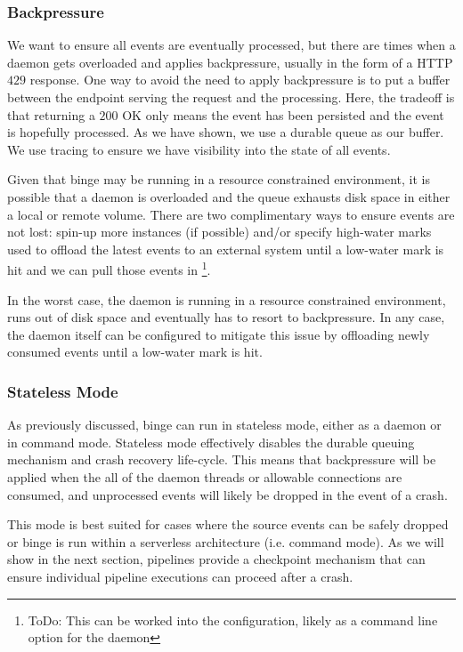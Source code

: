 \documentclass[10pt,twocolumn]{article}
\begin{document}
\subsubsection{Backpressure}

We want to ensure all events are eventually processed, but there are times when
a daemon gets overloaded and applies backpressure, usually in the form of a
HTTP $429$ response.  One way to avoid the need to apply backpressure is to put
a buffer between the endpoint serving the request and the processing.  Here, the
tradeoff is that returning a $200$ OK only means the event has been persisted
and the event is hopefully processed.  As we have shown, we use a durable queue
as our buffer.  We use tracing to ensure we have visibility into the state of
all events.  

Given that binge may be running in a resource constrained environment, it is
possible that a daemon is overloaded and the queue exhausts disk space in
either a local or remote volume.  There are two complimentary ways to ensure
events are not lost: spin-up more instances (if possible) and/or specify
high-water marks used to offload the latest events to an external system until
a low-water mark is hit and we can pull those events in \footnote{ToDo: This
can be worked into the configuration, likely as a command line option for the
daemon}.

In the worst case, the daemon is running in a resource constrained environment,
runs out of disk space and eventually has to resort to backpressure.  In any
case, the daemon itself can be configured to mitigate this issue by offloading
newly consumed events until a low-water mark is hit.

\subsubsection{Stateless Mode}

As previously discussed, binge can run in stateless mode, either as a daemon or
in command mode.  Stateless mode effectively disables the durable queuing
mechanism and crash recovery life-cycle.  This means that backpressure will be
applied when the all of the daemon threads or allowable connections are
consumed, and unprocessed events will likely be dropped in the event of a
crash.  

This mode is best suited for cases where the source events can be safely
dropped or binge is run within a serverless architecture (i.e. command
mode).  As we will show in the next section, pipelines provide a checkpoint
mechanism that can ensure individual pipeline executions can proceed after a
crash.
\end{document}

